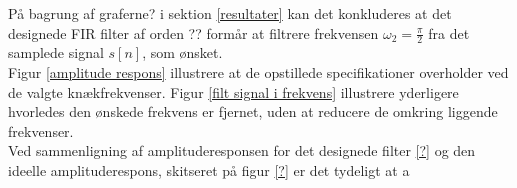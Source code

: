 På bagrung af graferne? i sektion \ref{resultater} kan det konkluderes at det designede FIR filter af orden ?? formår at filtrere frekvensen $\omega_2=\frac{\pi}{2}$ fra det samplede signal $s[n]$, som ønsket.\\
Figur \ref{amplitude respons} illustrere at de opstillede specifikationer overholder ved de valgte  knækfrekvenser. Figur \ref{filt signal i frekvens} illustrere yderligere hvorledes den ønskede frekvens er fjernet, uden at reducere de omkring liggende frekvenser.\\
Ved sammenligning af amplituderesponsen for det designede filter \ref{?} og den ideelle amplituderespons, skitseret på figur \ref{?} er det tydeligt at a   
         